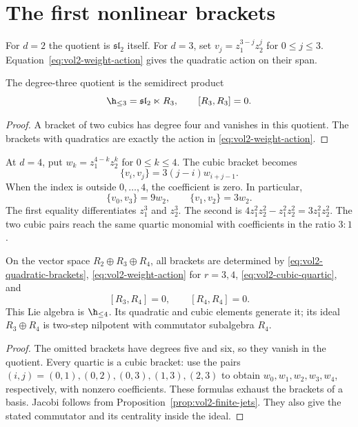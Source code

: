 \section{The first nonlinear brackets}

For $d=2$ the quotient is $\mathfrak{sl}_2$ itself. For $d=3$, set
$v_j=z_1^{3-j}z_2^j$ for $0\leq j\leq3$.
Equation~\eqref{eq:vol2-weight-action} gives the quadratic action on
their span.

\begin{proposition}\label{prop:vol2-cubic-jet}
The degree-three quotient is the semidirect product
\[
 \h_{\leq3}=\mathfrak{sl}_2\ltimes R_3,
 \qquad [R_3,R_3]=0.
\]
\end{proposition}

\begin{proof}
A bracket of two cubics has degree four and vanishes in this quotient.
The brackets with quadratics are exactly the action in
\eqref{eq:vol2-weight-action}.
\end{proof}

At $d=4$, put $w_k=z_1^{4-k}z_2^k$ for $0\leq k\leq4$.
The cubic bracket becomes
\begin{equation}\label{eq:vol2-cubic-quartic}
 \{v_i,v_j\}=3(j-i)w_{i+j-1}.
\end{equation}
When the index is outside $0,\ldots,4$, the coefficient is zero.
In particular,
\[
 \{v_0,v_3\}=9w_2,\qquad \{v_1,v_2\}=3w_2.
\]
The first equality differentiates $z_1^3$ and $z_2^3$.
The second is
$4z_1^2z_2^2-z_1^2z_2^2=3z_1^2z_2^2$.
The two cubic pairs reach the same quartic monomial with coefficients
in the ratio $3:1$.

\begin{proposition}\label{prop:vol2-quartic-jet}
On the vector space $R_2\oplus R_3\oplus R_4$, all brackets are
determined by \eqref{eq:vol2-quadratic-brackets},
\eqref{eq:vol2-weight-action} for $r=3,4$,
\eqref{eq:vol2-cubic-quartic}, and
\[
 [R_3,R_4]=0,\qquad [R_4,R_4]=0.
\]
This Lie algebra is $\h_{\leq4}$. Its quadratic and cubic elements
generate it; its ideal $R_3\oplus R_4$ is two-step nilpotent with
commutator subalgebra $R_4$.
\end{proposition}

\begin{proof}
The omitted brackets have degrees five and six, so they vanish in the
quotient. Every quartic is a cubic bracket: use the pairs
$(i,j)=(0,1),(0,2),(0,3),(1,3),(2,3)$ to obtain
$w_0,w_1,w_2,w_3,w_4$, respectively, with nonzero coefficients.
These formulas exhaust the brackets of a basis. Jacobi follows from
Proposition~\ref{prop:vol2-finite-jets}. They also give the stated
commutator and its centrality inside the ideal.
\end{proof}

